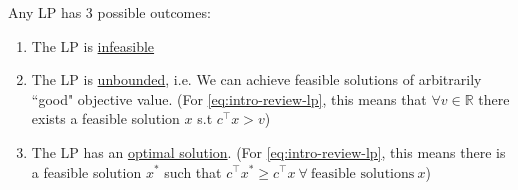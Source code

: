 \documentclass[12pt]{article}
\newcommand{\R}{\mathbb{R}}
\theoremstyle{definition}
\theoremstyle{remark}
\numberwithin{equation}{section}
\begin{document}
Any LP has 3 possible outcomes:
\begin{enumerate}
    \item The LP is \underline{infeasible}
    \item The LP is \underline{unbounded}, i.e. We can achieve feasible solutions of arbitrarily ``good" objective value. (For \eqref{eq:intro-review-lp}, this means that $\forall v \in \R$ there exists a feasible solution $x$ s.t $c^\intercal x > v$) 
    \item The LP has an \underline{optimal solution}. (For \eqref{eq:intro-review-lp}, this means there is a feasible solution $x^*$ such that $c^\intercal x^* \geq c^\intercal x \ \forall \ \text{feasible solutions} \ x$)
\end{enumerate}
\end{document}

